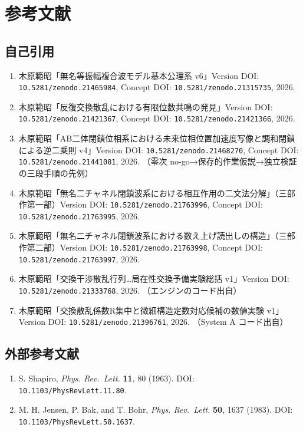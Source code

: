 \documentclass[
  a4paper,
]{ltjsarticle}
\providecommand{\tightlist}{%
  \setlength{\itemsep}{0pt}\setlength{\parskip}{0pt}}
\begin{document}
\section{参考文献}\label{ux53c2ux8003ux6587ux732e}

\subsection{自己引用}\label{ux81eaux5df1ux5f15ux7528}

\begin{enumerate}
\def\labelenumi{\arabic{enumi}.}
\tightlist
\item
  木原範昭「無名等振幅複合波モデル基本公理系 v6」Version DOI:
  \texttt{10.5281/zenodo.21465984}, Concept DOI:
  \texttt{10.5281/zenodo.21315735}, 2026.
\item
  木原範昭「反復交換散乱における有限位数共鳴の発見」Version DOI:
  \texttt{10.5281/zenodo.21421367}, Concept DOI:
  \texttt{10.5281/zenodo.21421366}, 2026.
\item
  木原範昭「AB二体閉鎖位相系における未来位相位置加速度写像と調和閉鎖による逆二乗則
  v4」Version DOI: \texttt{10.5281/zenodo.21468270}, Concept DOI:
  \texttt{10.5281/zenodo.21441081}, 2026. （零次
  no-go→保存的作業仮説→独立検証の三段手順の先例）
\item
  木原範昭「無名二チャネル閉鎖波系における相互作用の二文法分解」（三部作第一部）Version
  DOI: \texttt{10.5281/zenodo.21763996}, Concept DOI:
  \texttt{10.5281/zenodo.21763995}, 2026.
\item
  木原範昭「無名二チャネル閉鎖波系における数え上げ読出しの構造」（三部作第二部）Version
  DOI: \texttt{10.5281/zenodo.21763998}, Concept DOI:
  \texttt{10.5281/zenodo.21763997}, 2026.
\item
  木原範昭「交換干渉散乱行列\ldots 局在性交換予備実験総括 v1」Version
  DOI: \texttt{10.5281/zenodo.21333768}, 2026. （エンジンのコード出自）
\item
  木原範昭「交換散乱係数R集中と微細構造定数対応候補の数値実験
  v1」Version DOI: \texttt{10.5281/zenodo.21396761}, 2026. （System A
  コード出自）
\end{enumerate}

\subsection{外部参考文献}\label{ux5916ux90e8ux53c2ux8003ux6587ux732e}

\begin{enumerate}
\def\labelenumi{\arabic{enumi}.}
\setcounter{enumi}{11}
\tightlist
\item
  S. Shapiro, \emph{Phys. Rev.~Lett.} \textbf{11}, 80 (1963). DOI:
  \texttt{10.1103/PhysRevLett.11.80}.
\item
  M. H. Jensen, P. Bak, and T. Bohr, \emph{Phys. Rev.~Lett.}
  \textbf{50}, 1637 (1983). DOI: \texttt{10.1103/PhysRevLett.50.1637}.
\end{enumerate}
\end{document}
